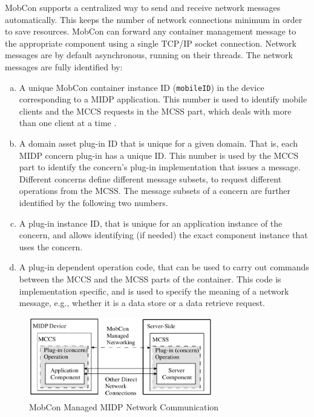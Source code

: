 MobCon supports a centralized way to send and receive network messages automatically. This keeps the number of network connections minimum in order to save resources. MobCon can forward any container management message to the appropriate component using a single TCP/IP socket connection. Network messages are by default asynchronous, running on their threads. The network messages are fully identified by:
\begin{enumerate}[a.]

\item A unique MobCon container instance ID (\texttt{mobileID}) in the device corresponding to a MIDP application. This number is used to identify mobile clients and the MCCS requests in the MCSS part, which deals with more than one client at a time .

\item A domain asset plug-in ID that is unique for a given domain. That is, each MIDP concern plug-in has a unique ID. This number is used by the MCCS part to identify the concern's plug-in implementation that issues a message. Different concerns define different message subsets, to request different operations from the MCSS. The message subsets of a concern are further identified by the following two numbers.

\item A plug-in instance ID, that is unique for an application instance of the concern, and allows identifying (if needed) the exact component instance that uses the concern.

\item A plug-in dependent operation code, that can be used to carry out commands between the MCCS and the MCSS parts of the container. This code is implementation specific, and is used to specify the meaning of a network message, e.g., whether it is a data store or a data retrieve request.
\end{enumerate}

\begin{figure}[ht]
	\begin{center}
		\includegraphics[width=8cm,height=!]{ch05/net}
	\end{center}
	\caption{MobCon Managed MIDP Network Communication}
	\label{fig:mc.net}
\end{figure}

